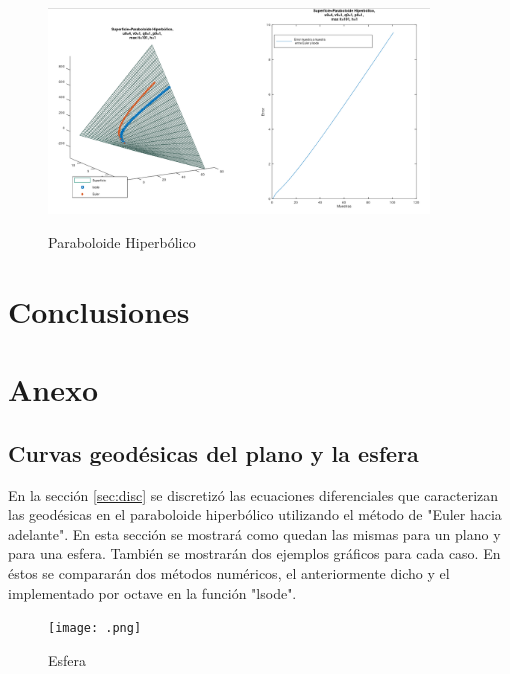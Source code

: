\documentclass{endm}
\begin{document}
\begin{figure}[H]
\caption{Paraboloide Hiperb\'olico}
\centering
\includegraphics[width=0.9\textwidth]{phmal.png}
\label{phmal}
\end{figure}


%
\section{Conclusiones}\label{Conclusiones}


%





%

\section{Anexo}
\subsection{Curvas geod\'esicas del plano y la esfera}
En la secci\'on \ref{sec:disc} se discretiz\'o las ecuaciones diferenciales que caracterizan las geod\'esicas en el paraboloide hiperb\'olico utilizando el m\'etodo de "Euler hacia adelante". En esta secci\'on se mostrar\'a como quedan las mismas para un plano y para una esfera. Tambi\'en se mostrar\'an dos ejemplos gr\'aficos para cada caso. En \'estos se comparar\'an dos m\'etodos num\'ericos, el anteriormente dicho y el implementado por octave en la funci\'on "lsode".

\begin{figure}[H]
\caption{Esfera}
\centering
\texttt{[image: .png]}
\label{fig:esfera}
\end{figure}
\end{document}
